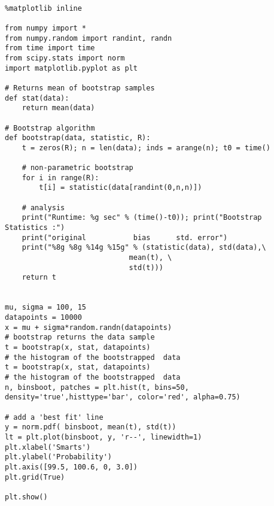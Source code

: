 \documentclass[%
oneside,                 %
final,                   %
10pt]{article}
\begin{document}
\begin{verbatim}

%matplotlib inline

from numpy import *
from numpy.random import randint, randn
from time import time
from scipy.stats import norm
import matplotlib.pyplot as plt

# Returns mean of bootstrap samples                                                                                                                                                
def stat(data):
    return mean(data)

# Bootstrap algorithm                                                                                                                                                              
def bootstrap(data, statistic, R):
    t = zeros(R); n = len(data); inds = arange(n); t0 = time()

    # non-parametric bootstrap                                                                                                                                                     
    for i in range(R):
        t[i] = statistic(data[randint(0,n,n)])

    # analysis                                                                                                                                                                     
    print("Runtime: %g sec" % (time()-t0)); print("Bootstrap Statistics :")
    print("original           bias      std. error")
    print("%8g %8g %14g %15g" % (statistic(data), std(data),\
                             mean(t), \
                             std(t)))
    return t


mu, sigma = 100, 15
datapoints = 10000
x = mu + sigma*random.randn(datapoints)
# bootstrap returns the data sample                                                                                                          t = bootstrap(x, stat, datapoints)
# the histogram of the bootstrapped  data  
t = bootstrap(x, stat, datapoints)
# the histogram of the bootstrapped  data                                            
n, binsboot, patches = plt.hist(t, bins=50, density='true',histtype='bar', color='red', alpha=0.75)

# add a 'best fit' line                                                                                                                                                          
y = norm.pdf( binsboot, mean(t), std(t))
lt = plt.plot(binsboot, y, 'r--', linewidth=1)
plt.xlabel('Smarts')
plt.ylabel('Probability')
plt.axis([99.5, 100.6, 0, 3.0])
plt.grid(True)

plt.show()


\end{verbatim}
\end{document}
